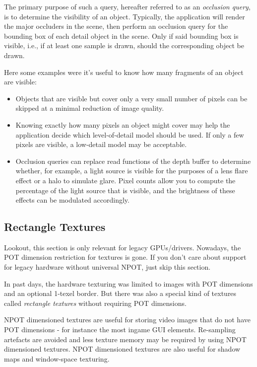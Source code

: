 The primary purpose of such a query, hereafter referred to as an \emph{occlusion query}, is to determine the visibility of an object. Typically, the application will render the major occluders in the scene, then perform an occlusion query for the bounding box of each detail object in the scene. Only if said bounding box is visible, i.e., if at least one sample is drawn, should the corresponding object be drawn.

Here some examples were it's useful to know how many fragments of an object are visible:
\begin{itemize}
\item{Objects that are visible but cover only a very small number of pixels can be skipped at a minimal reduction of image quality.}
\item{Knowing exactly how many pixels an object might cover may help the application decide which level-of-detail model should be used. If only a few pixels are visible, a low-detail model may be acceptable.}
\item{Occlusion queries can replace read functions of the depth buffer to determine whether, for example, a light source is visible for the purposes of a lens flare effect or a halo to simulate glare. Pixel counts allow you to compute the percentage of the light source that is visible, and the brightness of these effects can be modulated accordingly.}
\end{itemize}




\subsection{Rectangle Textures}
\hypertarget{Rectangle textures}{}
Lookout, this section is only relevant for legacy \ac{GPU}s/drivers. Nowadays, the \ac{POT} dimension restriction for textures is gone. If you don't care about support for legacy hardware without universal \ac{NPOT}, just skip this section.

In past days, the hardware texturing was limited to images with \ac{POT} dimensions and an optional 1-texel border. But there was also a special kind of textures called \emph{rectangle textures} without requiring \ac{POT} dimensions.

\ac{NPOT} dimensioned textures are useful for storing video images that do not have \ac{POT} dimensions - for instance the most ingame \ac{GUI} elements. Re-sampling artefacts are avoided and less texture memory may be required by using \ac{NPOT} dimensioned textures. \ac{NPOT} dimensioned textures are also useful for shadow maps and window-space texturing.

